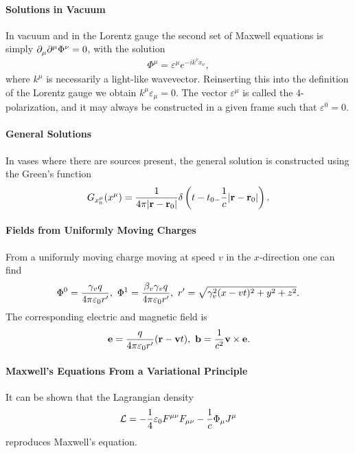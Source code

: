 \paragraph{Solutions in Vacuum}
In vacuum and in the Lorentz gauge the second set of Maxwell equations is simply $\del{\mu}{\del[\mu]{}{\Phi^{\nu}}} = 0$, with the solution
\begin{align*}
	\Phi^{\mu} = \varepsilon^{\mu}e^{-ik^{\nu}x_{\nu}},
\end{align*}
where $k^{\mu}$ is necessarily a light-like wavevector. Reinserting this into the definition of the Lorentz gauge we obtain $k^{\mu}\varepsilon_{\mu} = 0$. The vector $\varepsilon^{\mu}$ is called the $4$-polarization, and it may always be constructed in a given frame such that $\varepsilon^{0} = 0$.

\paragraph{General Solutions}
In vases where there are sources present, the general solution is constructed using the Green's function
\begin{align*}
	G_{x_{0}^{\mu}}(x^{\mu}) = \frac{1}{4\pi\abs{\vb{r} - \vb{r}_{0}}}\delta\left(t - t_{0 - }\frac{1}{c}\abs{\vb{r} - \vb{r}_{0}}\right).
\end{align*}

\paragraph{Fields from Uniformly Moving Charges}
From a uniformly moving charge moving at speed $v$ in the $x$-direction one can find
\begin{align*}
	\Phi^{0} = \frac{\gamma_{v}q}{4\pi\varepsilon_{0}r\p},\ \Phi^{1} = \frac{\beta_{v}\gamma_{v}q}{4\pi\varepsilon_{0}r\p},\ r\p = \sqrt{\gamma_{v}^{2}(x - vt)^{2} + y^{2} + z^{2}}.
\end{align*}
The corresponding electric and magnetic field is
\begin{align*}
	\vb{e} = \frac{q}{4\pi\varepsilon_{0}r\p}(\vb{r} - \vb{v}t),\ \vb{b} = \frac{1}{c^{2}}\vb{v}\times\vb{e}.
\end{align*}

\paragraph{Maxwell's Equations From a Variational Principle}
It can be shown that the Lagrangian density
\begin{align*}
	\lag = -\frac{1}{4}\varepsilon_{0}F^{\mu\nu}F_{\mu\nu} - \frac{1}{c}\Phi_{\mu}J^{\mu}
\end{align*}
reproduces Maxwell's equation.

